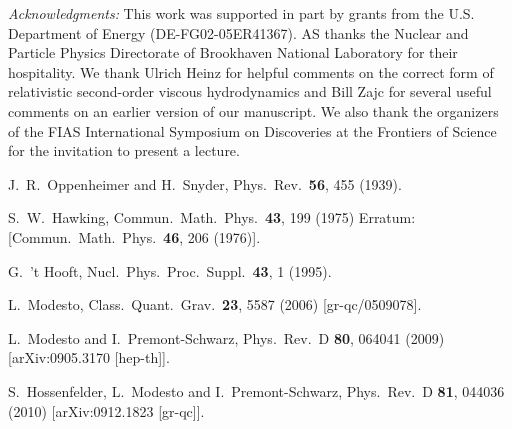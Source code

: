 \documentclass[article,twocolumn]{revtex4}
\begin{document}
{\em Acknowledgments:} This work was supported in part by grants from the U.S. Department of Energy (DE-FG02-05ER41367). AS thanks the Nuclear and Particle Physics Directorate of Brookhaven National Laboratory for their hospitality. We thank Ulrich Heinz for helpful comments on the correct form of relativistic second-order viscous hydrodynamics and Bill Zajc for several useful comments on an earlier version of our manuscript. We also thank the organizers of the FIAS International Symposium on Discoveries at the Frontiers of Science for the invitation to present a lecture.

\vfill

\begin{thebibliography}{99}

  J.~R.~Oppenheimer and H.~Snyder,
  Phys.\ Rev.\  {\bf 56}, 455 (1939).

  S.~W.~Hawking,
  Commun.\ Math.\ Phys.\  {\bf 43}, 199 (1975)
  Erratum: [Commun.\ Math.\ Phys.\  {\bf 46}, 206 (1976)].
  
  G.~'t Hooft,
  Nucl.\ Phys.\ Proc.\ Suppl.\  {\bf 43}, 1 (1995).
  
  L.~Modesto,
  Class.\ Quant.\ Grav.\  {\bf 23}, 5587 (2006)
  [gr-qc/0509078].
  
  L.~Modesto and I.~Premont-Schwarz,
  Phys.\ Rev.\ D {\bf 80}, 064041 (2009)
  [arXiv:0905.3170 [hep-th]].
  
  S.~Hossenfelder, L.~Modesto and I.~Premont-Schwarz,
  Phys.\ Rev.\ D {\bf 81}, 044036 (2010)
  [arXiv:0912.1823 [gr-qc]].


\end{thebibliography}
\end{document}
